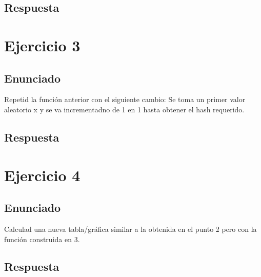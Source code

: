 \documentclass[10pt,a4paper,spanish]{report}
\begin{document}
\section{Respuesta}
\noindent

\chapter{Ejercicio 3}

\section{Enunciado}
\noindent
Repetid la función anterior con el siguiente cambio: Se toma un primer valor aleatorio x y se va incrementadno de 1 en 1 hasta obtener el hash requerido.

\section{Respuesta}
\noindent

\chapter{Ejercicio 4}

\section{Enunciado}
\noindent
Calculad una nueva tabla/gráfica similar a la obtenida en el punto 2 pero con la función construida en 3.

\section{Respuesta}
\noindent

\end{document}
